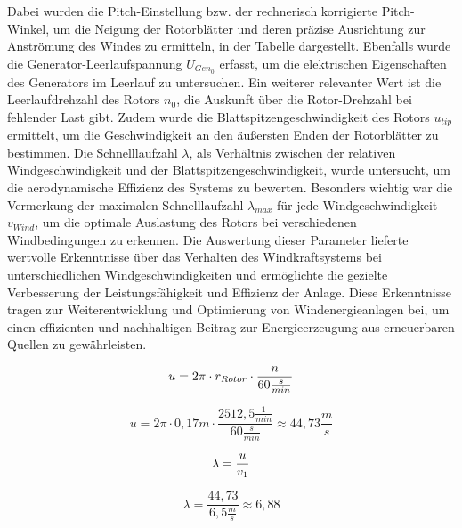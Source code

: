 \newpage
     Dabei wurden die Pitch-Einstellung bzw. der rechnerisch korrigierte Pitch-Winkel, um die Neigung der Rotorblätter und deren 
     präzise Ausrichtung zur Anströmung des Windes zu ermitteln, in der Tabelle dargestellt. Ebenfalls wurde die Generator-Leerlaufspannung $U_{Gen_0}$ erfasst, 
     um die elektrischen Eigenschaften des Generators im Leerlauf zu untersuchen. Ein weiterer relevanter Wert ist die Leerlaufdrehzahl des Rotors $n_0$, 
     die Auskunft über die Rotor-Drehzahl bei fehlender Last gibt. Zudem wurde die Blattspitzengeschwindigkeit des Rotors $u_{tip}$ ermittelt, um die Geschwindigkeit an den äußersten Enden der Rotorblätter zu bestimmen. 
     Die Schnelllaufzahl $\lambda$, als Verhältnis zwischen der relativen Windgeschwindigkeit und der Blattspitzengeschwindigkeit, wurde untersucht, um die aerodynamische Effizienz des Systems zu bewerten. Besonders wichtig war die Vermerkung der maximalen
    Schnelllaufzahl $\lambda_{max}$ für jede Windgeschwindigkeit $v_{Wind}$, um die optimale Auslastung des Rotors bei verschiedenen Windbedingungen zu erkennen. Die Auswertung dieser Parameter lieferte
    wertvolle Erkenntnisse über das Verhalten des Windkraftsystems bei unterschiedlichen Windgeschwindigkeiten und ermöglichte die gezielte Verbesserung der Leistungsfähigkeit und Effizienz der Anlage. Diese Erkenntnisse tragen zur Weiterentwicklung und 
    Optimierung von Windenergieanlagen bei,
     um einen effizienten und nachhaltigen 
     Beitrag zur Energieerzeugung aus erneuerbaren Quellen zu gewährleisten.

\begin{equation}
    \centering
    u = 2 \pi \cdot r_{Rotor} \cdot \frac{n}{60 \frac{s}{min}}
    \label{eq:230615_Umfangsgeschwindigkeit}
\end{equation}

$$    u = 2 \pi \cdot 0,17m \cdot \frac{2512,5 \frac{1}{min}}{60 \frac{s}{min}}\approx 44,73\frac{m}{s} $$

\begin{equation}
    \centering
    \lambda = \frac{u}{v_1}
    \label{eq:230615_Schnelllaufzahl}
\end{equation}

$$\lambda = \frac{44,73}{6,5 \frac{m}{s}}\approx 6,88$$

